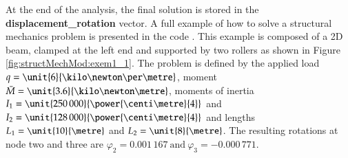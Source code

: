 
At the end of the analysis, the final solution is stored in the
\textbf{displacement\_rotation} vector.  A full example of how to
solve a structural mechanics problem is presented in the code
.
This example is composed of a 2D beam, clamped at the left end and
supported by two rollers as shown in Figure
\ref{fig:structMechMod:exem1_1}.  The problem is defined by the
applied load $q=\unit{6}{\kilo\newton\per\metre}$, moment $\bar{M} =
\unit{3.6}{\kilo\newton\metre}$, moments of inertia $I_1 =
\unit{250\,000}{\power{\centi\metre}{4}}$ and $I_2 =
\unit{128\,000}{\power{\centi\metre}{4}}$ and lengths $L_1 =
\unit{10}{\metre}$ and $L_2 = \unit{8}{\metre}$.  The resulting
rotations at node two and three are $ \varphi_2 = 0.001\,167\
\mbox{and}\ \varphi_3 = -0.000\,771.$


